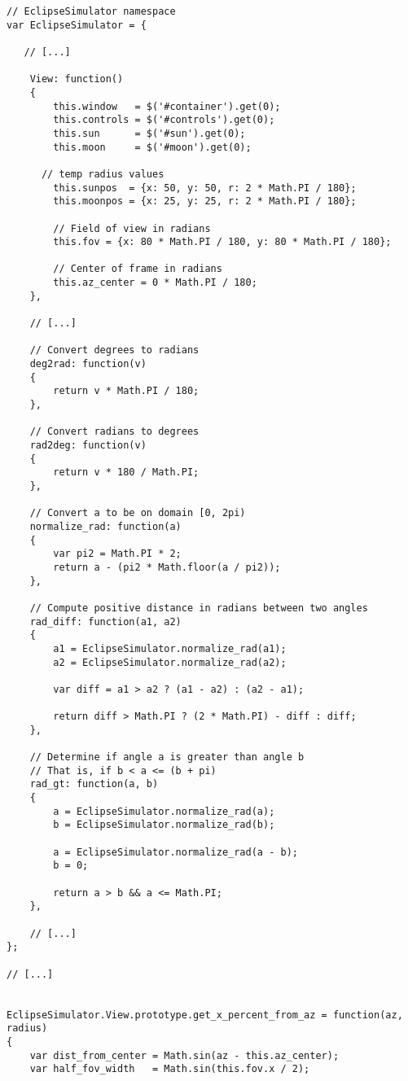 \documentclass[10pt, onecolumn, draftclsnofoot, letterpaper, compsoc]{IEEEtran}
\begin{document}
\begin{verbatim}
// EclipseSimulator namespace
var EclipseSimulator = {

   // [...]

    View: function()
    {
        this.window   = $('#container').get(0);
        this.controls = $('#controls').get(0);
        this.sun      = $('#sun').get(0);
        this.moon     = $('#moon').get(0);

      // temp radius values
        this.sunpos  = {x: 50, y: 50, r: 2 * Math.PI / 180};
        this.moonpos = {x: 25, y: 25, r: 2 * Math.PI / 180};

        // Field of view in radians
        this.fov = {x: 80 * Math.PI / 180, y: 80 * Math.PI / 180};

        // Center of frame in radians
        this.az_center = 0 * Math.PI / 180;
    },

    // [...]

    // Convert degrees to radians
    deg2rad: function(v)
    {
        return v * Math.PI / 180;
    },

    // Convert radians to degrees
    rad2deg: function(v)
    {
        return v * 180 / Math.PI;
    },

    // Convert a to be on domain [0, 2pi)
    normalize_rad: function(a)
    {
        var pi2 = Math.PI * 2;
        return a - (pi2 * Math.floor(a / pi2));
    },

    // Compute positive distance in radians between two angles
    rad_diff: function(a1, a2)
    {
        a1 = EclipseSimulator.normalize_rad(a1);
        a2 = EclipseSimulator.normalize_rad(a2);

        var diff = a1 > a2 ? (a1 - a2) : (a2 - a1);

        return diff > Math.PI ? (2 * Math.PI) - diff : diff;
    },

    // Determine if angle a is greater than angle b
    // That is, if b < a <= (b + pi) 
    rad_gt: function(a, b)
    {
        a = EclipseSimulator.normalize_rad(a);
        b = EclipseSimulator.normalize_rad(b);

        a = EclipseSimulator.normalize_rad(a - b);
        b = 0;

        return a > b && a <= Math.PI;
    },

    // [...]
};

// [...]


EclipseSimulator.View.prototype.get_x_percent_from_az = function(az, radius)
{
    var dist_from_center = Math.sin(az - this.az_center);
    var half_fov_width   = Math.sin(this.fov.x / 2);


\end{verbatim}
\end{document}

